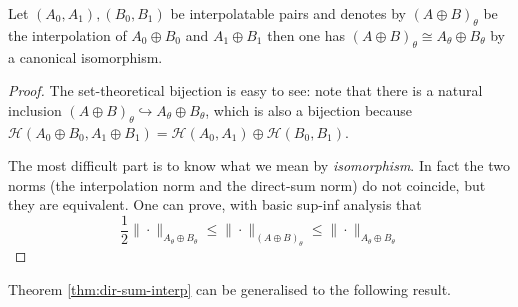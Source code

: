 \begin{theorem}
\label{thm:dir-sum-interp}
Let \((A_0,A_1), (B_0, B_1)\) be interpolatable pairs and denotes by \((A\oplus
B)_\theta\) be the interpolation of \(A_0 \oplus B_0\) and \(A_1 \oplus B_1\) then
one has \((A\oplus B)_\theta \cong A_\theta \oplus B_\theta\) by a canonical isomorphism.
\end{theorem}
\begin{proof}
The set-theoretical bijection is easy to see: note that there is a natural inclusion
\((A\oplus B)_\theta \hookrightarrow A_\theta\oplus B_\theta\), which is also a
bijection because  \(\mathcal{H}(A_0\oplus B_0, A_1 \oplus B_1) = \mathcal{H}(A_0, A_1)
\oplus \mathcal{H}(B_0,B_1)\).

The most difficult part is to know what we mean by \emph{isomorphism}. In fact the two norms
(the interpolation norm and the direct-sum norm) do not coincide, but they are
equivalent. One can prove, with basic sup-inf analysis that 
\[
 \frac{1}{2}\|\cdot \|_{A_\theta\oplus B_\theta} \leq \|\cdot \|_{(A\oplus B)_\theta} \leq
\|\cdot\|_{A_\theta \oplus B_\theta}
\]
\end{proof}

Theorem \ref{thm:dir-sum-interp} can be generalised to the following result.

